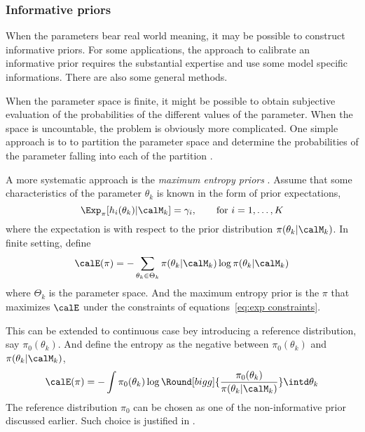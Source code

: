 

\subsubsection{Informative priors}
\label{ssub:Informative priors}

When the parameters bear real world meaning, it may be possible to construct
informative priors. For some applications, the approach to calibrate an
informative prior requires the substantial expertise and use some model
specific informations. There are also some general methods.

When the parameter space is finite, it might be possible to obtain subjective
evaluation of the probabilities of the different values of the parameter. When
the space is uncountable, the problem is obviously more complicated. One
simple approach is to to partition the parameter space and determine the
probabilities of the parameter falling into each of the partition
\cite[][sec.~3.2.2]{Robert:2007tc}.

A more systematic approach is the \emph{maximum entropy priors}
\cite{Jaynes:1989vx}. Assume that some characteristics of the parameter
$\theta_k$ is known in the form of prior expectations,
\begin{equation}
  \Exp_{\pi}[h_i(\theta_k)|\calM_k] = \gamma_i, \qquad\text{for } i =
  1,\dots,K
  \label{eq:exp constraints}
\end{equation}
where the expectation is with respect to the prior distribution
$\pi(\theta_k|\calM_k)$. In finite setting, define
\begin{equation}
  \calE(\pi) = -\sum_{\theta_k\in\Theta_k}
  \pi(\theta_k|\calM_k)\log \pi (\theta_k|\calM_k)
\end{equation}
where $\Theta_k$ is the parameter space. And the maximum entropy prior is the
$\pi$ that maximizes $\calE$ under the constraints of equations~\ref{eq:exp
  constraints}.

This can be extended to continuous case bey introducing a reference
distribution, say $\pi_0(\theta_k)$. And define the entropy as the negative
\kld between $\pi_0(\theta_k)$ and $\pi(\theta_k|\calM_k)$,
\begin{equation}
  \calE(\pi) = -\int \pi_0(\theta_k)\log\Round[bigg]{
    \frac{\pi_0(\theta_k)}{\pi(\theta_k|\calM_k)}}\intd\theta_k
\end{equation}
The reference distribution $\pi_0$ can be chosen as one of the non-informative
prior discussed earlier. Such choice is justified in
\cite[][chap.~9]{Robert:2007tc}.

